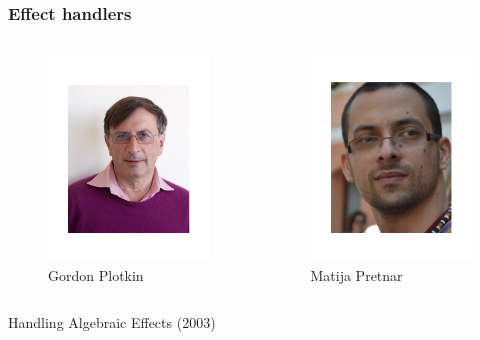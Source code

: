 \begin{frame}
  \frametitle{Effect handlers}
  \begin{columns}
    \begin{column}{0.5\textwidth}
      \begin{center}
        \begin{figure}
          \includegraphics[scale=0.3]{figures/gordonplotkin.png}
          \caption{Gordon Plotkin}
        \end{figure}
      \end{center}
    \end{column}
    \begin{column}{0.5\textwidth}
      \begin{center}
        \begin{figure}
          \includegraphics[scale=0.3]{figures/pretnar.png}
          \caption{Matija Pretnar}
        \end{figure}
      \end{center}
    \end{column}
  \end{columns}
  \begin{center}
      Handling Algebraic Effects (2003)
  \end{center}
\end{frame}

